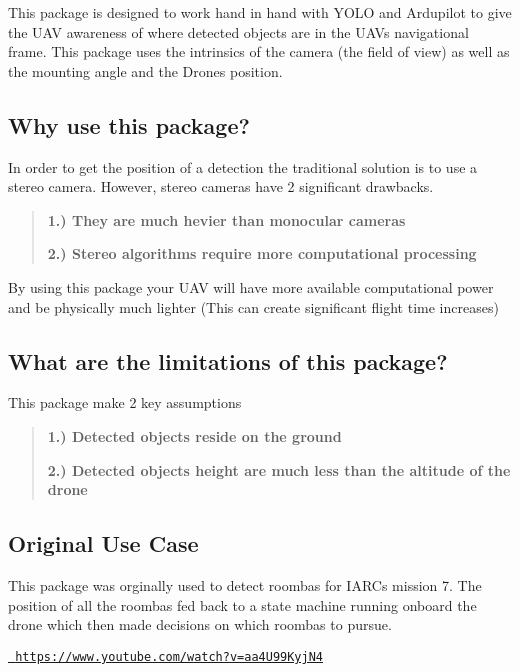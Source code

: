 This package is designed to work hand in hand with Y\+O\+LO and Ardupilot to give the U\+AV awareness of where detected objects are in the U\+AV\textquotesingle{}s navigational frame. This package uses the intrinsics of the camera (the field of view) as well as the mounting angle and the Drone\textquotesingle{}s position.

\subsection*{Why use this package?}

In order to get the position of a detection the traditional solution is to use a stereo camera. However, stereo cameras have 2 significant drawbacks.

\begin{quote}
{\bfseries{1.) They are much hevier than monocular cameras}}

{\bfseries{2.) Stereo algorithms require more computational processing}} \end{quote}


By using this package your U\+AV will have more available computational power and be physically much lighter (This can create significant flight time increases)

\subsection*{What are the limitations of this package?}

This package make 2 key assumptions \begin{quote}
{\bfseries{1.) Detected objects reside on the ground}}

{\bfseries{2.) Detected object\textquotesingle{}s height are much less than the altitude of the drone}} \end{quote}


\subsection*{Original Use Case}

This package was orginally used to detect roombas for I\+A\+RC\textquotesingle{}s mission 7. The position of all the roombas fed back to a state machine running onboard the drone which then made decisions on which roombas to pursue.

\href{https://www.youtube.com/watch?v=aa4U99KyjN4}{\texttt{ https\+://www.\+youtube.\+com/watch?v=aa4\+U99\+Kyj\+N4}}

